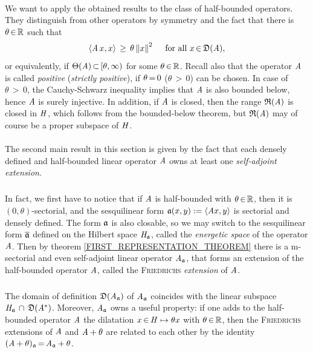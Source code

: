 \documentclass[11pt,twoside]{article}
\begin{document}
\paragraph{} %
We want to apply the obtained results to the class of half-bounded operators.
They distinguish from other operators by symmetry and the fact
that there is $\theta {\,\in\,} {\mathbb{R}}$ such that
\[
\langle \mathit{A} \,x,x \rangle \, \geq \, \theta \left\lVert x \right\rVert^2
\quad \mbox{ for all } x {\,\in\,} \mathfrak{D}(\mathit{A}),
\]
or equivalently,
if $\Theta(\mathit{A}) {\,\subset\,} [\theta,\infty)$ for some $\theta {\,\in\,} {\mathbb{R}}$.
Recall also
that the operator $\mathit{A}$ is called \textit{positive}
(\textit{strictly positive}),
if $\theta {\,=\,} 0$ ($\theta {\,>\,} 0$) can be chosen.
In case of $\theta {\,>\,} 0$,
the {Cauchy-Schwarz} inequality implies
that $\mathit{A}$ is also bounded below,
hence $\mathit{A}$ is surely injective.
In addition,
if $\mathit{A}$ is closed,
then the range $\mathfrak{R}(\mathit{A})$ is closed in $\mathit{H}$,
which follows from the bounded-below theorem,
but $\mathfrak{R}(\mathit{A})$ may of course be a proper subspace of $\mathit{H}$.

\paragraph{} %
The second main result in this section is given by the fact
that each densely defined and half-bounded linear operator $\mathit{A}$
owns at least one \textit{self-adjoint extension}.

\subparagraph{} %
In fact,
we first have to notice that
if $\mathit{A}$ is half-bounded with $\theta {\,\in\,} {\mathbb{R}}$,
then it is $(0,\theta)$-sectorial,
and the sesquilinear form $\mathfrak{a}(x,y) := \langle \mathit{A} x,y \rangle$
is sectorial and densely defined.
The form $\mathfrak{a}$ is also closable,
so we may switch to the sesquilinear form $\overline{\mathfrak{a}}$ defined on the
Hilbert space $\mathit{H}_{\mathfrak{a}}$,
called the \textit{energetic space} of the operator $\mathit{A}$.
Then by theorem \ref{FIRST_REPRESENTATION_THEOREM}
there is a m-sectorial and even self-adjoint linear operator $\mathit{A}_{\mathfrak{a}}$,
that forms an extension of the half-bounded operator $\mathit{A}$,
called the \textsc{Friedrichs} \textit{extension} of $\mathit{A}$.

\subparagraph{} %
The domain of definition $\mathfrak{D}(\mathit{A}_{\mathfrak{a}})$ of $\mathit{A}_{\mathfrak{a}}$
coincides with the linear subspace $\mathit{H}_{\mathfrak{a}} \, \cap \, \mathfrak{D}(\mathit{A}^*)$.
Moreover,
$\mathit{A}_{\mathfrak{a}}$ owns a useful property:
if one adds to the half-bounded operator $\mathit{A}$ the dilatation 
$x {\,\in\,} \mathit{H} \mapsto \theta x$ with $\theta {\,\in\,} {\mathbb{R}}$,
then the \textsc{Friedrichs} extensions of $\mathit{A}$ and $\mathit{A} + \theta$
are related to each other by the identity
$(\mathit{A} + \theta)_{\mathfrak{a}} {\,=\,} \mathit{A}_{\mathfrak{a}} + \theta$.
\end{document}
